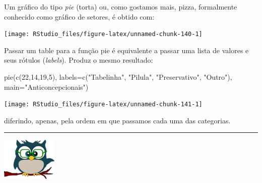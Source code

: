 \documentclass[
]{article}
\newenvironment{Shaded}{\begin{snugshade}}{\end{snugshade}}
\newcommand{\AttributeTok}[1]{\textcolor[rgb]{0.77,0.63,0.00}{#1}}
\newcommand{\DecValTok}[1]{\textcolor[rgb]{0.00,0.00,0.81}{#1}}
\newcommand{\FunctionTok}[1]{\textcolor[rgb]{0.00,0.00,0.00}{#1}}
\newcommand{\NormalTok}[1]{#1}
\newcommand{\OtherTok}[1]{\textcolor[rgb]{0.56,0.35,0.01}{#1}}
\newcommand{\SpecialCharTok}[1]{\textcolor[rgb]{0.00,0.00,0.00}{#1}}
\newcommand{\StringTok}[1]{\textcolor[rgb]{0.31,0.60,0.02}{#1}}
\begin{document}
Um gráfico do tipo \emph{pie} (torta) ou, como gostamos mais, pizza,
formalmente conhecido como gráfico de setores, é obtido com:

\begin{Shaded}
\end{Shaded}

\begin{center}\texttt{[image: RStudio\_files/figure-latex/unnamed-chunk-140-1]} \end{center}

Passar um table para a função pie é equivalente a passar uma lista de
valores e seus rótulos (\emph{labels}). Produz o mesmo resultado:

\begin{Shaded}
\begin{Highlighting}[]
\FunctionTok{pie}\NormalTok{(}\FunctionTok{c}\NormalTok{(}\DecValTok{22}\NormalTok{,}\DecValTok{14}\NormalTok{,}\DecValTok{19}\NormalTok{,}\DecValTok{5}\NormalTok{), }
    \AttributeTok{labels=}\FunctionTok{c}\NormalTok{(}\StringTok{"Tabelinha"}\NormalTok{, }\StringTok{"Pilula"}\NormalTok{, }\StringTok{"Preservativo"}\NormalTok{, }\StringTok{"Outro"}\NormalTok{), }
    \AttributeTok{main=}\StringTok{"Anticoncepcionais"}\NormalTok{)}
\end{Highlighting}
\end{Shaded}

\begin{center}\texttt{[image: RStudio\_files/figure-latex/unnamed-chunk-141-1]} \end{center}

diferindo, apenas, pela ordem em que passamos cada uma das categorias.

\begin{center}\rule{0.5\linewidth}{0.5pt}\end{center}

\begin{flushleft}\includegraphics[width=0.08\linewidth]{coruja} \end{flushleft}
\end{document}
